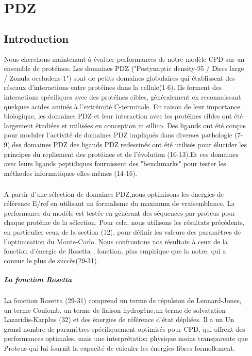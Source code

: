 
\chapter{PDZ}
\label{chap:PDZ}


\section{Introduction}

Nous cherchons maintenant à évaluer performances de notre modèle CPD sur un ensemble de protéines. Les domaines PDZ ("Postynaptic density-95 / Discs large / Zonula occludens-1") sont de petits domaines globulaires qui établissent  des réseaux d'interactions entre protéines dans la cellule(1-6).   Ils forment des interactions spécifiques avec des protéines cibles, généralement en reconnaissant quelques acides aminés à l'extrémité C-terminale. En raison de leur importance biologique, les domaines PDZ et leur interaction avec les protéines cibles ont été largement étudiées et utilisées en conception in sillico. Des ligands ont été conçus  pour moduler l'activité de domaines PDZ impliqués dans diverses pathologie (7-9).des domaines  PDZ des ligands PDZ redessinés ont été utilisés pour élucider les principes du repliement des protéines et de l'évolution (10-13).Et ces domaines avec leurs ligands peptidiques fournissent des "benchmarks" pour tester les méthodes informatiques elles-mêmes (14-16).
\paragraph{}
A partir d'une sélection de domaines PDZ,nous optimisons les énergies de référence E/ref  en utilisant un formalisme du maximum de vraisemblance. La performance du modèle est testée en générant des séquences par proteus pour chaque protéine de la sélection. Pour cela, nous utilisons les résultats précédents, en particulier ceux de la section (12), pour définir les valeurs des paramètres de l'optimisation du Monte-Carlo. Nous confrontons nos résultats à ceux de la fonction d'énergie de Rosetta , fonction, plus empirique que la notre, qui a connue le plus de succès(29-31).    



\paragraph{La fonction Rosetta}

La fonction Rosetta (29-31) comprend un terme de répulsion de Lennard-Jones, un terme Coulomb, un terme de liaison hydrogène,un terme de solvatation Lazaridis-Karplus (32) et des énergies de référence d'état dépliées. Il a un
Un grand nombre de paramètres spécifiquement optimisés pour CPD, qui offrent des performances optimales, mais une interprétation physique moins transparente que Proteus qui lui fournit la capacité de calculer les énergies libres formellement.

